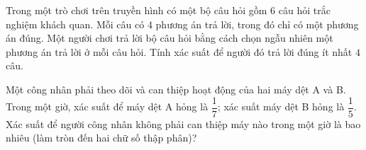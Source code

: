 \begin{bt}%
	Trong một trò chơi trên truyền hình có một bộ câu hỏi gồm $6$ câu hỏi trắc nghiệm khách quan. Mỗi câu có $4$ phương án trả lời, trong đó chỉ có một phương án đúng. Một người chơi trả lời bộ câu hỏi bằng cách chọn ngẫu nhiên một phương án trả lời ở mỗi câu hỏi. Tính xác suất để người đó trả lời đúng ít nhất $4$ câu.
\end{bt}

\begin{bt}%

	Một công nhân phải theo dõi và can thiệp hoạt động của hai máy dệt A và B. Trong một giờ, xác suất để máy dệt A hỏng là $\dfrac{1}{7}$; xác suất máy dệt B hỏng là $\dfrac{1}{5}$. Xác suất để người công nhân không phải can thiệp máy nào trong một giờ là bao nhiêu (làm tròn đến hai chữ số thập phân)?
\end{bt}

